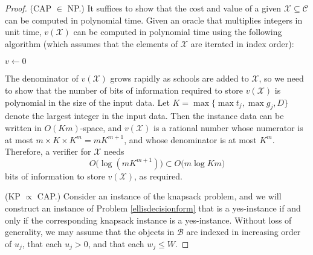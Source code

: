 \begin{proof}
(CAP $\in$ NP.) It suffices to show that the cost and value of a given $\mathcal{X} \subseteq \mathcal{C}$ can be computed in polynomial time. Given an oracle that multiplies integers in unit time, $v(\mathcal{X})$ can be computed in polynomial time using the following algorithm (which assumes that the elements of $\mathcal{X}$ are iterated in index order):

\LinesNotNumbered 
\begin{algorithm}[h]
\SetAlCapNameSty{}%
$v \gets 0$\;
\;
\end{algorithm}

\noindent The denominator of $v(\mathcal{X})$ grows rapidly as schools are added to $\mathcal{X}$, so we need to show that the number of bits of information required to store $v(\mathcal{X})$ is polynomial in the size of the input data. Let $K = \max\bigl\{\max t_j, \max g_j, D\bigr\}$ denote the largest integer in the input data. Then the instance data can be written in $O(K m)$-space, and $v(\mathcal{X})$ is a rational number whose numerator is at most $m \times K \times K^m = m K^{m+1}$, and whose denominator is at most $K^m$. Therefore, a verifier for $\mathcal{X}$ needs
\[O\bigl(\log (m K^{m+1}) \bigr) \subset O\bigl( m \log Km )\]
bits of information to store $v(\mathcal{X})$, as required.

(KP $\propto$ CAP.) Consider an instance of the knapsack problem, and we will construct an instance of Problem \ref{ellisdecisionform} that is a yes-instance if and only if the corresponding knapsack instance is a yes-instance. Without loss of generality, we may assume that the objects in $\mathcal{B}$ are indexed in increasing order of $u_j$, that each $u_j >0$, and that each $w_j \leq W$. 


\end{proof}
